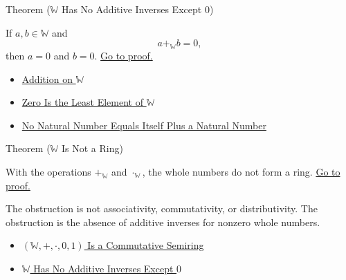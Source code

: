 \begin{theorembox}{Theorem (\texorpdfstring{$\mathbb{W}$}{W} Has No Additive Inverses Except \texorpdfstring{$0$}{0})}
\begin{theorem}
\label{thm:w-has-no-additive-inverses-except-zero}
If $a,b\in\mathbb{W}$ and
\[
a+_{\mathbb{W}}b=0,
\]
then $a=0$ and $b=0$.
\hyperref[prf:w-has-no-additive-inverses-except-zero]{Go to proof.}
\end{theorem}
\end{theorembox}

\begin{dependencies}
\begin{itemize}
  \item \hyperref[def:addition-on-w]{Addition on $\mathbb{W}$}
  \item \hyperref[thm:zero-least-element-of-w]{Zero Is the Least Element of $\mathbb{W}$}
  \item \hyperref[thm:no-natural-number-equals-itself-plus-a-natural-number]{No Natural Number Equals Itself Plus a Natural Number}
\end{itemize}
\end{dependencies}

\begin{theorembox}{Theorem (\texorpdfstring{$\mathbb{W}$}{W} Is Not a Ring)}
\begin{theorem}
\label{thm:w-is-not-a-ring}
With the operations $+_{\mathbb{W}}$ and $\cdot_{\mathbb{W}}$, the whole
numbers do not form a ring.
\hyperref[prf:w-is-not-a-ring]{Go to proof.}
\end{theorem}
\end{theorembox}

\begin{remark*}[Interpretation]
The obstruction is not associativity, commutativity, or distributivity. The
obstruction is the absence of additive inverses for nonzero whole numbers.
\end{remark*}

\begin{dependencies}
\begin{itemize}
  \item \hyperref[thm:w-commutative-semiring]{$(\mathbb{W},+,\cdot,0,1)$ Is a Commutative Semiring}
  \item \hyperref[thm:w-has-no-additive-inverses-except-zero]{$\mathbb{W}$ Has No Additive Inverses Except $0$}
\end{itemize}
\end{dependencies}
